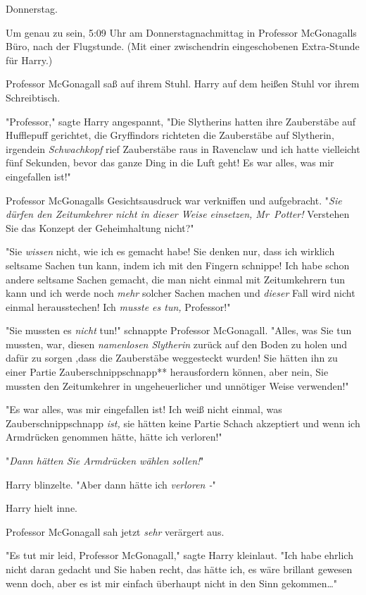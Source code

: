 {\later

Donnerstag.

Um genau zu sein, 5:09 Uhr am Donnerstagnachmittag in Professor McGonagalls Büro, nach der Flugstunde. (Mit einer zwischendrin eingeschobenen Extra-Stunde für Harry.)

Professor McGonagall saß auf ihrem Stuhl. Harry auf dem heißen Stuhl vor ihrem Schreibtisch.

"Professor," sagte Harry angespannt, "Die Slytherins hatten ihre Zauberstäbe auf Hufflepuff gerichtet, die Gryffindors richteten die Zauberstäbe auf Slytherin, irgendein \emph{Schwachkopf} rief Zauberstäbe raus in Ravenclaw und ich hatte vielleicht fünf Sekunden, bevor das ganze Ding in die Luft geht! Es war alles, was mir eingefallen ist!"

Professor McGonagalls Gesichtsausdruck war verkniffen und aufgebracht. "\emph{Sie dürfen den Zeitumkehrer nicht in dieser Weise einsetzen, Mr~Potter!} Verstehen Sie das Konzept der Geheimhaltung nicht?"

"Sie \emph{wissen} nicht, wie ich es gemacht habe! Sie denken nur, dass ich wirklich seltsame Sachen tun kann, indem ich mit den Fingern schnippe! Ich habe schon andere seltsame Sachen gemacht, die man nicht einmal mit Zeitumkehrern tun kann und ich werde noch \emph{mehr} solcher Sachen machen und \emph{dieser} Fall wird nicht einmal herausstechen! Ich \emph{musste es tun,} Professor!"

"Sie mussten es \emph{nicht} tun!" schnappte Professor McGonagall. "Alles, was Sie tun mussten, war, diesen \emph{namenlosen Slytherin} zurück auf den Boden zu holen und dafür zu sorgen ,dass die Zauberstäbe weggesteckt wurden! Sie hätten ihn zu einer Partie Zauberschnippschnapp** herausfordern können, aber nein, Sie mussten den Zeitumkehrer in ungeheuerlicher und unnötiger Weise verwenden!"

"Es war alles, was mir eingefallen ist! Ich weiß nicht einmal, was Zauberschnippschnapp \emph{ist,} sie hätten keine Partie Schach akzeptiert und wenn ich Armdrücken genommen hätte, hätte ich verloren!"

"\emph{Dann hätten Sie Armdrücken wählen sollen!}"

Harry blinzelte. "Aber dann hätte ich \emph{verloren -}"

Harry hielt inne.

Professor McGonagall sah jetzt \emph{sehr} verärgert aus.

"Es tut mir leid, Professor McGonagall," sagte Harry kleinlaut. "Ich habe ehrlich nicht daran gedacht und Sie haben recht, das hätte ich, es wäre brillant gewesen wenn doch, aber es ist mir einfach überhaupt nicht in den Sinn gekommen…"

}
